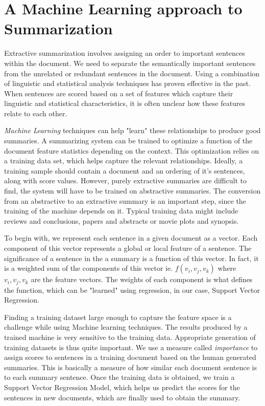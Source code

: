 \documentclass[BTech]{nitgoathesis}
\begin{document}
\chapter{A Machine Learning approach to Summarization}
Extractive summarization involves assigning an order to important sentences within the document. We need to separate the semantically important sentences from the unrelated or redundant sentences in the document. Using a combination of linguistic and statistical analysis techniques has proven effective in the past. When sentences are scored based on a set of features which capture their linguistic and statistical characteristics, it is often unclear how these features relate to each other. 
\par
\emph{Machine Learning} techniques can help "learn" these relationships to produce good summaries. A summarizing system can be trained to optimize a function of the document feature statistics depending on the context. This optimization relies on a training data set, which helps capture the relevant relationships. Ideally, a training sample should contain a document and an ordering of it's sentences, along with score values. However, purely extractive summaries are difficult to find, the system will have to be trained on abstractive summaries. The conversion from an abstractive to an extractive summary is an important step, since the training of the machine depends on it. Typical training data might include reviews and conclusions, papers and abstracts or movie plots and synopsis.
\par
To begin with, we represent each sentence in a given document as a vector. Each component of this vector represents a global or local feature of a sentence. The significance of a sentence in the a summary is a function of this vector. In fact, it is a weighted sum of the components of this vector ie. $f(v_i, v_j, v_k)$ where $v_i, v_j, v_k$ are the feature vectors. The weights of each component is what defines the function, which can be "learned" using regression, in our case, Support Vector Regression. 
\par
Finding a training dataset large enough to capture the feature space is a challenge while using Machine learning techniques. The results produced by a trained machine is very sensitive to the training data. Appropriate generation of training datasets is thus quite important. We use a measure called \emph{importance} to assign scores to sentences in a training document based on the human generated summaries. This is basically a measure of how similar each document sentence is to each summary sentence. Once the training data is obtained, we train a Support Vector Regression Model, which helps us predict the scores for the sentences in new documents, which are finally used to obtain the summary. \\
\end{document}
